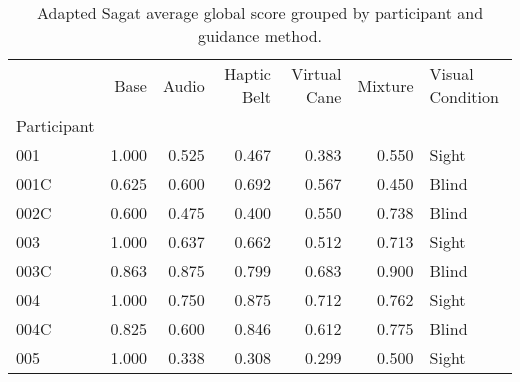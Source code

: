 
\begin{table}[!htb]
\centering
\caption{Adapted Sagat average global score grouped by participant and guidance method.}
\label{tab:sagat_average}
\begin{tabular}{lrrrrrl}
\toprule
{} &  Base &  Audio &  Haptic Belt &  Virtual Cane &  Mixture & Visual Condition \\
Participant &       &        &              &               &          &                  \\
\midrule
001         & 1.000 &  0.525 &        0.467 &         0.383 &    0.550 &            Sight \\
001C        & 0.625 &  0.600 &        0.692 &         0.567 &    0.450 &            Blind \\
002C        & 0.600 &  0.475 &        0.400 &         0.550 &    0.738 &            Blind \\
003         & 1.000 &  0.637 &        0.662 &         0.512 &    0.713 &            Sight \\
003C        & 0.863 &  0.875 &        0.799 &         0.683 &    0.900 &            Blind \\
004         & 1.000 &  0.750 &        0.875 &         0.712 &    0.762 &            Sight \\
004C        & 0.825 &  0.600 &        0.846 &         0.612 &    0.775 &            Blind \\
005         & 1.000 &  0.338 &        0.308 &         0.299 &    0.500 &            Sight \\
\bottomrule
\end{tabular}
\end{table}

